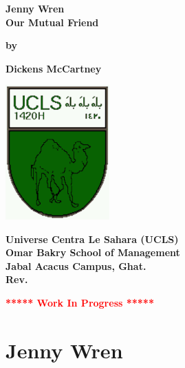 \documentclass[12pt]{book}
\newcommand{\pengarangs}{%
    Dickens McCartney\\
}
\newcommand{\judul}{%
Jenny Wren\\[13pt]
Our Mutual Friend
}
\begin{document}
\begin{titlepage}
    \begin{center}    

    \vspace*{15mm}
    \textbf{\Large \judul}

    \vspace*{30mm}       
    \textbf{by}

    \vspace*{15mm}    
    \textbf{\Large \pengarangs}

    \vspace*{4.0cm}

    \begin{center}
        \includegraphics[width=40mm]{ucls-coat}
    \end{center}

    \textbf{
       Universe Centra Le Sahara (UCLS)\\[11pt]
       Omar Bakry School of Management\\[11pt]
       Jabal Acacus Campus, Ghat. \\[11pt]
       Rev. \rev%
    }

    \vspace*{5mm}    
    \textbf{\LARGE \textcolor{red}{***** Work In Progress *****}}

    \end{center}

\end{titlepage}


\tableofcontents

\newpage

\chapter*{Jenny Wren}
\end{document}
